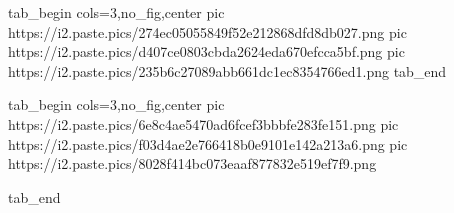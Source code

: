  
 
 
 
 
\qqSecCmtScr


\ifcmt
  tab_begin cols=3,no_fig,center
     pic https://i2.paste.pics/274ec05055849f52e212868dfd8db027.png
		 pic https://i2.paste.pics/d407ce0803cbda2624eda670efcca5bf.png
		 pic https://i2.paste.pics/235b6c27089abb661dc1ec8354766ed1.png
  tab_end
\fi

\ifcmt
  tab_begin cols=3,no_fig,center
		pic https://i2.paste.pics/6e8c4ae5470ad6fcef3bbbfe283fe151.png
		pic https://i2.paste.pics/f03d4ae2e766418b0e9101e142a213a6.png
		pic https://i2.paste.pics/8028f414bc073eaaf877832e519ef7f9.png

  tab_end
\fi
